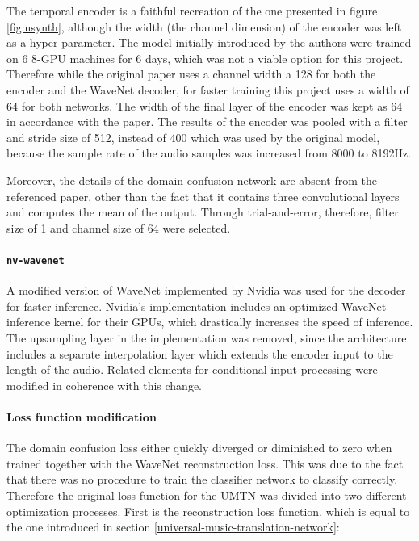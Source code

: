 \documentclass[12pt,a4paper,]{report}
\begin{document}
The temporal encoder is a faithful recreation of the one presented in
figure \ref{fig:nsynth}, although the width (the channel dimension) of
the encoder was left as a hyper-parameter. The model initially
introduced by the authors were trained on 6 8-GPU machines for 6 days,
which was not a viable option for this project. Therefore while the
original paper uses a channel width a 128 for both the encoder and the
WaveNet decoder, for faster training this project uses a width of 64 for
both networks. The width of the final layer of the encoder was kept as
64 in accordance with the paper. The results of the encoder was pooled
with a filter and stride size of 512, instead of 400 which was used by
the original model, because the sample rate of the audio samples was
increased from 8000 to 8192Hz.

Moreover, the details of the domain confusion network are absent from
the referenced paper, other than the fact that it contains three
convolutional layers and computes the mean of the output. Through
trial-and-error, therefore, filter size of 1 and channel size of 64 were
selected.

\paragraph{\texttt{nv-wavenet}}

A modified version of WaveNet implemented by Nvidia was used for the
decoder for faster inference. Nvidia's implementation includes an
optimized WaveNet inference kernel for their GPUs, which drastically
increases the speed of inference. The upsampling layer in the
implementation was removed, since the architecture includes a separate
interpolation layer which extends the encoder input to the length of the
audio. Related elements for conditional input processing were modified
in coherence with this change.

\paragraph{Loss function modification \label{loss-function-modification}}

The domain confusion loss either quickly diverged or diminished to zero
when trained together with the WaveNet reconstruction loss. This was due
to the fact that there was no procedure to train the classifier network
to classify correctly. Therefore the original loss function for the UMTN
was divided into two different optimization processes. First is the
reconstruction loss function, which is equal to the one introduced in
section \ref{universal-music-translation-network}:
\end{document}
